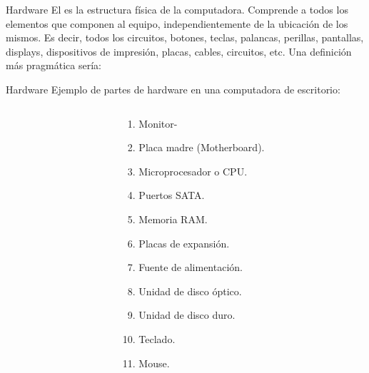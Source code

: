 \begin{frame}{Hardware}
  El  es la estructura física de la computadora. Comprende a
  todos los elementos  que componen al equipo,
  independientemente de la ubicación de los mismos.
  \jump
  Es decir, todos los circuitos, botones, teclas, palancas, perillas, pantallas,
  displays, dispositivos de impresión, placas, cables, circuitos, etc.
  \jump
  Una definición más pragmática sería:\\
\end{frame}


\begin{frame}{Hardware}
  Ejemplo de partes de hardware en una computadora de escritorio:
  \begin{columns}
    \begin{column}{0.5\textwidth}
    \end{column}
    \begin{column}{0.5\textwidth}
      \begin{enumerate}
        \item Monitor-
        \item Placa madre (Motherboard).
        \item Microprocesador o CPU.
        \item Puertos SATA.
        \item Memoria RAM.
        \item Placas de expansión.
        \item Fuente de alimentación.
        \item Unidad de disco óptico.
        \item Unidad de disco duro.
        \item Teclado.
        \item Mouse.
      \end{enumerate}
    \end{column}
  \end{columns}
\end{frame}


